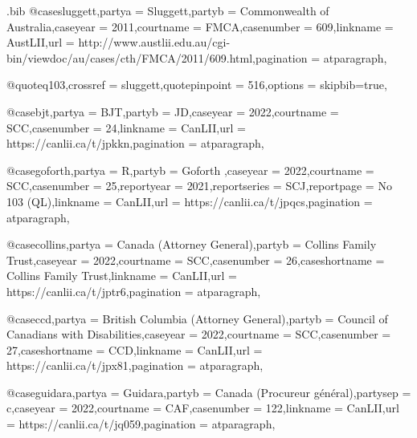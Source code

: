 
\begin{filecontents*}[overwrite]{\jobname.bib}
@case{sluggett,partya = {Sluggett},partyb = {Commonwealth of Australia},caseyear = {2011},courtname = {FMCA},casenumber = {609},linkname = {AustLII},url = {http://www.austlii.edu.au/cgi-bin/viewdoc/au/cases/cth/FMCA/2011/609.html},pagination = {atparagraph},}

@quote{q103,crossref = {sluggett},quotepinpoint = {516},options = {skipbib=true},}


@case{bjt,partya = {BJT},partyb = {JD\@},caseyear = {2022},courtname = {SCC},casenumber = {24},linkname = {CanLII},url = {https://canlii.ca/t/jpkkn},pagination = {atparagraph},}

@case{goforth,partya = {R},partyb = {Goforth },caseyear = {2022},courtname = {SCC},casenumber = {25},reportyear = {2021},reportseries = {SCJ},reportpage = {No 103 (QL)},linkname = {CanLII},url = {https://canlii.ca/t/jpqcs},pagination = {atparagraph},}

@case{collins,partya = {Canada (Attorney General)},partyb = {Collins Family Trust},caseyear = {2022},courtname = {SCC},casenumber = {26},caseshortname = {Collins Family Trust},linkname = {CanLII},url = {https://canlii.ca/t/jptr6},pagination = {atparagraph},}

@case{ccd,partya = {British Columbia (Attorney General)},partyb = {Council of Canadians with Disabilities},caseyear = {2022},courtname = {SCC},casenumber = {27},caseshortname = {CCD},linkname = {CanLII},url = {https://canlii.ca/t/jpx81},pagination = {atparagraph},}

@case{guidara,partya = {Guidara},partyb = {Canada (Procureur général)},partysep = {c},caseyear = {2022},courtname = {CAF},casenumber = {122},linkname = {CanLII},url = {https://canlii.ca/t/jq059},pagination = {atparagraph},}


\end{filecontents*}
